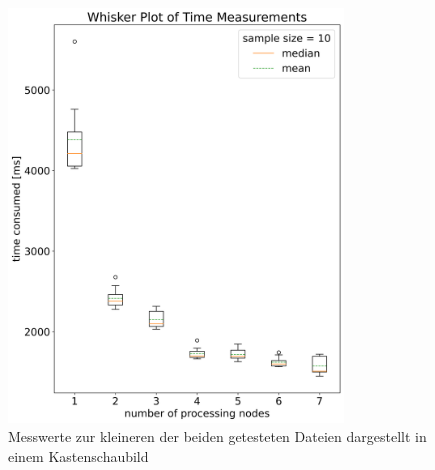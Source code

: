\begin{figure}[!t]
    \centering
    \includegraphics[width=3.5in]{boxplots.png}
    \caption{Messwerte zur kleineren der beiden getesteten Dateien dargestellt in einem Kastenschaubild}
    \label{boxplot_times}
\end{figure}

